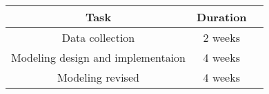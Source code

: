 \documentclass{article}
\begin{document}
\begin{normalsize}
		\begin{center}
			\begin{tabular}{ |c|c|c| } 
				\hline
				Task & Duration  \\ 
				\hline
				Data collection & 2 weeks \\ 
				Modeling design and implementaion & 4 weeks \\ 
				Modeling revised & 4 weeks \\ 
				\hline
			\end{tabular}
		\end{center}
		

		
		
		
	\end{normalsize}
	
\end{document}
